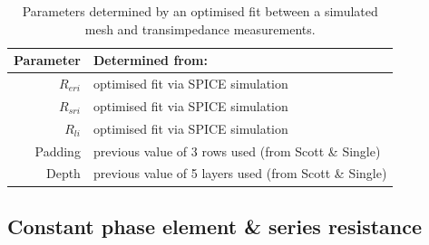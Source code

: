     \begin{table}
      \begin{center}
        \begin{tabular} {r | l}
          Parameter & Determined from:\\
          \hline
          $R_{eri}$ & optimised fit via SPICE simulation\\
          $R_{sri}$ & optimised fit via SPICE simulation\\
          $R_{li}$ & optimised fit via SPICE simulation\\
          Padding & previous value of 3 rows used (from Scott \& Single)\\
          Depth & previous value of 5 layers used (from Scott \& Single)
        \end{tabular}
      \end{center}
      \caption{\label{tab:pt2-parameterDesc-ResistorMesh}Parameters determined by an optimised fit between a simulated mesh and transimpedance measurements.}
    \end{table}


  \subsection{Constant phase element \& series resistance}



